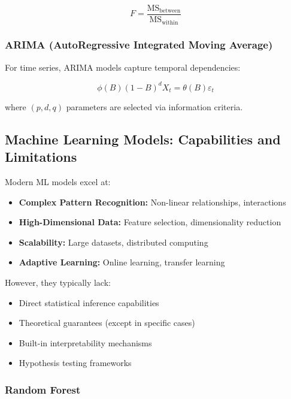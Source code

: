 \documentclass[11pt,a4paper]{article}
\begin{document}
\begin{equation}
F = \frac{\text{MS}_{\text{between}}}{\text{MS}_{\text{within}}}
\end{equation}

\subsubsection{ARIMA (AutoRegressive Integrated Moving Average)}

For time series, ARIMA models capture temporal dependencies:

\begin{equation}
\phi(B)(1-B)^d X_t = \theta(B)\varepsilon_t
\end{equation}

where $(p,d,q)$ parameters are selected via information criteria.

\subsection{Machine Learning Models: Capabilities and Limitations}

Modern ML models excel at:

\begin{itemize}
    \item \textbf{Complex Pattern Recognition:} Non-linear relationships, interactions
    \item \textbf{High-Dimensional Data:} Feature selection, dimensionality reduction
    \item \textbf{Scalability:} Large datasets, distributed computing
    \item \textbf{Adaptive Learning:} Online learning, transfer learning
\end{itemize}

However, they typically lack:

\begin{itemize}
    \item Direct statistical inference capabilities
    \item Theoretical guarantees (except in specific cases)
    \item Built-in interpretability mechanisms
    \item Hypothesis testing frameworks
\end{itemize}

\subsubsection{Random Forest}
\end{document}
